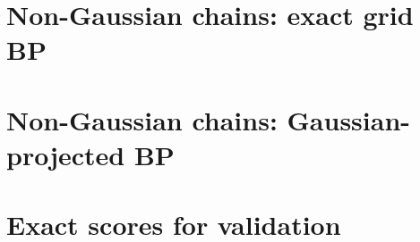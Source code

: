 

\section{Non-Gaussian chains: exact grid BP}\label{app:code-grid}



\section{Non-Gaussian chains: Gaussian-projected BP}
\label{app:code-gproj}



\section{Exact scores for validation}\label{app:code-exact}


